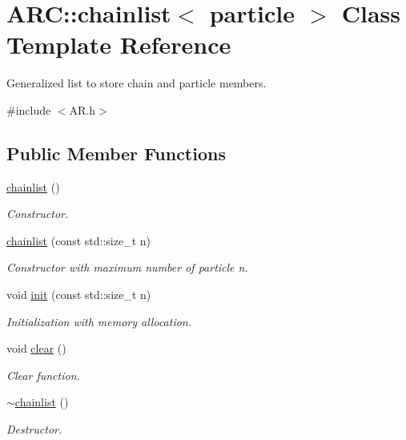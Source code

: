 \hypertarget{classARC_1_1chainlist}{}\section{A\+RC\+:\+:chainlist$<$ particle $>$ Class Template Reference}
\label{classARC_1_1chainlist}


Generalized list to store chain and particle members.  




{\ttfamily \#include $<$A\+R.\+h$>$}

\subsection*{Public Member Functions}
\begin{DoxyCompactItemize}
\item 
\hyperlink{classARC_1_1chainlist_ab4e3b53aee12e8970d94e1b368088bfa}{chainlist} ()
\begin{DoxyCompactList}\small\item\em Constructor. \end{DoxyCompactList}\item 
\hyperlink{classARC_1_1chainlist_a80fdd1846ac0d15cee0726a0f9548371}{chainlist} (const std\+::size\+\_\+t n)
\begin{DoxyCompactList}\small\item\em Constructor with maximum number of particle {\itshape n}. \end{DoxyCompactList}\item 
void \hyperlink{classARC_1_1chainlist_a84a2c65edf27bd25254e188ebf7d5dce}{init} (const std\+::size\+\_\+t n)
\begin{DoxyCompactList}\small\item\em Initialization with memory allocation. \end{DoxyCompactList}\item 
void \hyperlink{classARC_1_1chainlist_ad0b0f86e25b46acf2a9507c1a7deb700}{clear} ()
\begin{DoxyCompactList}\small\item\em Clear function. \end{DoxyCompactList}\item 
\hyperlink{classARC_1_1chainlist_ab24d982dbeee6269f2912747db6f9be4}{$\sim$chainlist} ()
\begin{DoxyCompactList}\small\item\em Destructor. \end{DoxyCompactList}\item 

\end{DoxyCompactItemize}
